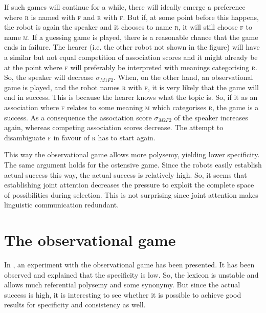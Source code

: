 If such games will continue for a while, there will ideally emerge a preference where {\scshape r} is named with {\scshape f} and {\scshape r} with {\scshape f}. But if, at some point before this happens, the robot is again the speaker and it chooses to name {\scshape r}, it will still choose {\scshape f} to name {\scshape m}. If a guessing game is played, there is a reasonable chance that the game ends in failure. The hearer (i.e. the other robot not shown in the figure) will have a similar but not equal competition of association scores and it might already be at the point where {\scshape f} will preferably be interpreted with meanings categorising {\scshape r}. So, the speaker will decrease $\sigma_{M1F2}$. When, on the other hand, an observational game is played, and the robot names {\scshape r} with {\scshape f}, it is very likely that the game will end in success. This is because the hearer knows what the topic is. So, if it as an association where {\scshape f} relates to some meaning {\scshape m} which categorises {\scshape r}, the game is a success. As a consequence the association score $\sigma_{M2F2}$ of the speaker increases again, whereas competing association scores decrease. The attempt to disambiguate {\scshape f} in favour of {\scshape r} has to start again.

This way the observational game allows more polysemy, yielding lower specificity. The same argument holds for the ostensive game. Since the robots easily establish actual success this way, the actual success is relatively high. So, it seems that establishing joint attention decreases the pressure to exploit the complete space of possibilities during selection. This is not surprising since joint attention makes linguistic communication redundant.


\section{The observational game}\label{s:par:observ}\label{s:feed:oli}

In , an experiment with the observational game has been presented. It has been observed and explained that the specificity is low. So, the lexicon is unstable and allows much referential polysemy and some synonymy. But since the actual success is high, it is interesting to see whether it is possible to achieve good results for specificity and consistency as well. 

